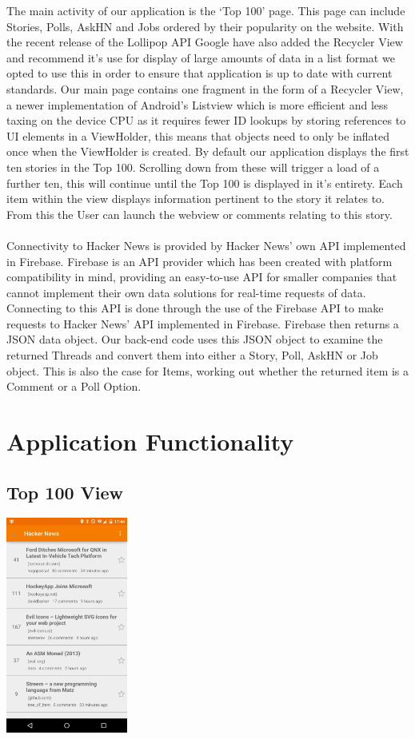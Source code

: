 \documentclass[11pt]{article}
\begin{document}
The main activity of our application is the ‘Top 100' page. This page can include Stories, Polls, AskHN and Jobs ordered by their popularity on the website. With the recent release of the Lollipop API Google have also added the Recycler View and recommend it's use for display of large amounts of data in a list format we opted to use this in order to ensure that application is up to date with current standards. Our main page contains one fragment in the form of a Recycler View, a newer implementation of Android's Listview which is more efficient and less taxing on the device CPU as it requires  fewer ID lookups by storing references to UI elements in a ViewHolder, this means that objects need to only be inflated once when the ViewHolder is created. By default our application displays the first ten stories in the Top 100. Scrolling down from these will trigger a load of a further ten, this will continue until the Top 100 is displayed in it's entirety. Each item within the view displays information pertinent to the story it relates to. From this the User can launch the webview or comments relating to this story.
\\
\\
Connectivity to Hacker News is provided by Hacker News' own API implemented in Firebase. Firebase is an API provider which has been created with platform compatibility in mind, providing an easy-to-use API for smaller companies that cannot implement their own data solutions for real-time requests of data. Connecting to this API is done through the use of the Firebase API to make requests to Hacker News' API implemented in Firebase. Firebase then returns a JSON data object. Our back-end code uses this JSON object to examine the returned Threads and convert them into either a Story, Poll, AskHN or Job object. This is also the case for Items, working out whether the returned item is a Comment or a Poll Option.

\section*{Application Functionality}

\subsection*{Top 100 View}
\begin{center}
\includegraphics[width=0.3\textwidth]{threadView.png}
\end{center}
\end{document}
